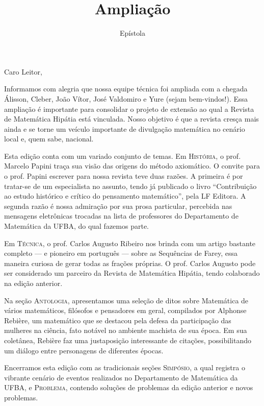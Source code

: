 \documentclass[onecolumn]{hipatia}
\title{Ampliação}
\subtitle{Epístola}
\author{}
\begin{document}
\setcounter{page}{\epistolapage}
\maketitle
\leftskip=2.5cm
\rightskip=2.5cm


\noindent Caro Leitor,
\vspace{1cm}


Informamos com alegria que nossa equipe técnica foi ampliada com a chegada Álisson, Cleber, João Vítor, José Valdomiro e Yure (sejam bem-vindos!). Essa ampliação é importante para consolidar o projeto de extensão ao qual a Revista de Matemática Hipátia está vinculada. Nosso
objetivo é que a revista cresça mais ainda e se torne um veículo importante
de divulgação matemática no cenário local e, quem sabe, nacional.

Esta edição conta com um variado conjunto de temas. Em \textsc{História}, o prof. Marcelo Papini traça sua visão das origens do método axiomático. O convite para 
o prof. Papini escrever para nossa revista teve duas razões. A primeira é por
tratar-se de um especialista no assunto, tendo já publicado o livro ``Contribuição ao estudo histórico e crítico do pensamento matemático'', pela LF Editora.
A segunda razão é nossa admiração por sua prosa particular, 
percebida nas mensagens eletrônicas trocadas na lista de professores do Departamento
de Matemática da UFBA, do qual fazemos parte. 

Em \textsc{Técnica}, o prof. Carlos Augusto Ribeiro nos brinda com um 
artigo bastante completo --- e pioneiro em português --- sobre as Sequências de Farey, essa maneira 
curiosa de gerar todas as frações próprias. O prof. Carlos Augusto 
pode ser considerado um parceiro da Revista de Matemática Hipátia, tendo colaborado na edição anterior.

Na seção \textsc{Antologia}, apresentamos uma seleção de ditos 
sobre Matemática de vários matemáticos, filósofos e pensadores em geral, compilados por Alphonse Rebière, um matemático que 
se destacou pela defesa da participação das mulheres na ciência,
fato notável no ambiente machista de sua época. Em sua 
coletânea, Rebière faz uma 
justaposição interessante de citações, possibilitando um 
diálogo entre personagens de diferentes épocas.

Encerramos esta edição com as tradicionais seções \textsc{Simpósio},
a qual registra o vibrante cenário de eventos realizados no 
Departamento de Matemática da UFBA, e \textsc{Problema}, contendo
soluções de problemas da edição anterior e novos problemas.
\end{document}

